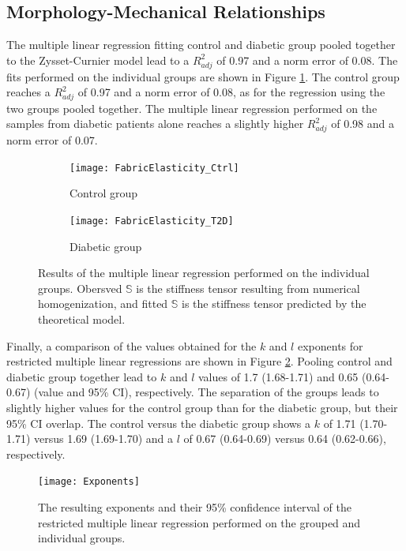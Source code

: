 \documentclass[a4paper,fleqn]{DC_ArtStyle}
\begin{document}
	\subsection{Morphology-Mechanical Relationships}
	The multiple linear regression fitting control and diabetic group pooled together to the Zysset-Curnier model lead to a $R_{adj}^{2}$ of 0.97 and a norm error of 0.08.
	The fits performed on the individual groups are shown in Figure \ref{FigLinReg}.
	The control group reaches a $R_{adj}^{2}$ of 0.97 and a norm error of 0.08, as for the regression using the two groups pooled together.
	The multiple linear regression performed on the samples from diabetic patients alone reaches a slightly higher $R_{adj}^{2}$ of 0.98 and a norm error of 0.07.
	\\[0.5em]

	\begin{figure}
		\centering
		\begin{subfigure}[b]{0.45\linewidth}
			\texttt{[image: FabricElasticity\_Ctrl]}
			\caption{Control group}
		\end{subfigure}\hfill
		\begin{subfigure}[b]{0.45\linewidth}
			\texttt{[image: FabricElasticity\_T2D]}
			\caption{Diabetic group}
		\end{subfigure}
		\caption{Results of the multiple linear regression performed on the individual groups.
				 Obersved $\mathbb{S}$ is the stiffness tensor resulting from numerical homogenization, and fitted $\mathbb{S}$ is the stiffness tensor predicted by the theoretical model.}
		\label{FigLinReg}
	\end{figure}

	Finally, a comparison of the values obtained for the $k$ and $l$ exponents for restricted multiple linear regressions are shown in Figure \ref{FigExponents}.
	Pooling control and diabetic group together lead to $k$ and $l$ values of 1.7 (1.68-1.71) and 0.65 (0.64-0.67) (value and 95\% CI), respectively.
	The separation of the groups leads to slightly higher values for the control group than for the diabetic group, but their 95\% CI overlap.
	The control versus the diabetic group shows a $k$ of 1.71 (1.70-1.71) versus 1.69 (1.69-1.70) and a $l$ of 0.67 (0.64-0.69) versus 0.64 (0.62-0.66), respectively.
   
	\begin{figure}
		\centering
		\texttt{[image: Exponents]}
		\caption{The resulting exponents and their 95\% confidence interval of the restricted multiple linear regression performed on the grouped and individual groups.}
		\label{FigExponents}
	\end{figure}
\end{document}
